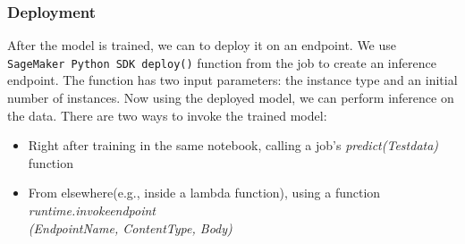     \subsubsection{Deployment}
    After the model is trained, we can to deploy it on an endpoint. We use \verb|SageMaker Python SDK deploy()| function from the job to create an inference endpoint. The function has two input parameters:  the instance type and an initial number of instances. Now using the deployed model, we can perform inference on the data. There are two ways to invoke the trained model:
    \begin{itemize}
        \item Right after training in the same notebook, calling a job’s \textit{predict(Test\textunderscore data)} function
        \item From elsewhere(e.g., inside a lambda function), using a function \textit{runtime.invoke\textunderscore endpoint\\(EndpointName, ContentType, Body)}
    \end{itemize}
    
